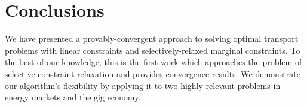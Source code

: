 \documentclass[twocolumn]{article}
\begin{document}
\section{Conclusions}
\label{sec:conc}
We have presented a provably-convergent approach to solving optimal transport problems with linear constraints and selectively-relaxed marginal constraints. To the best of our knowledge, this is the first work which approaches the problem of selective constraint relaxation and provides convergence results. We demonstrate our algorithm's flexibility by applying it to two highly relevant problems in energy markets and the gig economy.

%

\small




\end{document}
